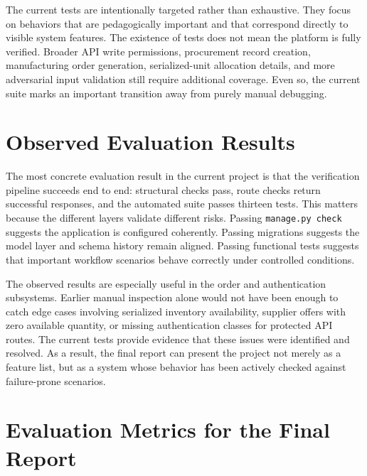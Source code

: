 \documentclass[12pt,letterpaper,oneside,openany]{book}
\begin{document}
\begin{justifying}
The current tests are intentionally targeted rather than exhaustive. They focus
on behaviors that are pedagogically important and that correspond directly to
visible system features. The existence of tests does not mean the platform is
fully verified. Broader API write permissions, procurement record creation,
manufacturing order generation, serialized-unit allocation details, and more
adversarial input validation still require additional coverage. Even so, the
current suite marks an important transition away from purely manual debugging.
\end{justifying}

\section{Observed Evaluation Results}

\begin{justifying}
The most concrete evaluation result in the current project is that the
verification pipeline succeeds end to end: structural checks pass, route checks
return successful responses, and the automated suite passes thirteen tests.
This matters because the different layers validate different risks. Passing
\texttt{manage.py check} suggests the application is configured coherently.
Passing migrations suggests the model layer and schema history remain aligned.
Passing functional tests suggests that important workflow scenarios behave
correctly under controlled conditions.
\end{justifying}

\begin{justifying}
The observed results are especially useful in the order and authentication
subsystems. Earlier manual inspection alone would not have been enough to catch
edge cases involving serialized inventory availability, supplier offers with
zero available quantity, or missing authentication classes for protected API
routes. The current tests provide evidence that these issues were identified and
resolved. As a result, the final report can present the project not merely as a
feature list, but as a system whose behavior has been actively checked against
failure-prone scenarios.
\end{justifying}

\section{Evaluation Metrics for the Final Report}
\end{document}
